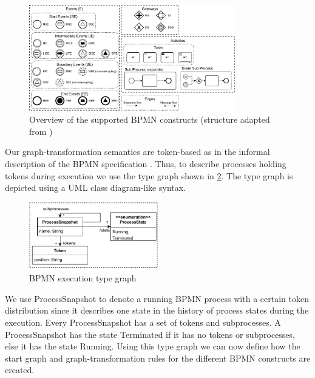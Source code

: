 \documentclass[adraft, copyright, creativecommons]{eptcs} %
\begin{document}
\begin{figure}[h]
    \centering
    \includegraphics[width=0.8\textwidth]{images/bpmn_semantics-feature_overview.pdf}
    \caption{Overview of the supported BPMN constructs (structure adapted from \cite{houhouFirstOrderLogicVerification2022})}
    \label{fig:bpmnConstructsOverview}
\end{figure}

Our graph-transformation semantics are token-based as in the informal description of the BPMN specification \cite{objectmanagementgroupBusinessProcessModel2013}.
Thus, to describe processes holding tokens during execution we use the type graph shown in \cref{fig:typeGraph}.
The type graph is depicted using a UML class diagram-like syntax.

\begin{figure}[h]
    \centering
    \includegraphics[width=0.5\textwidth]{images/bpmn_semantics-typegraph.pdf}
    \caption{BPMN execution type graph}
    \label{fig:typeGraph}
\end{figure}

We use \textsf{ProcessSnapshot} to denote a running BPMN process with a certain token distribution since it describes one state in the history of process states during the execution.
Every \textsf{ProcessSnapshot} has a set of \textsf{tokens} and \textsf{subprocesses}.
A \textsf{ProcessSnapshot} has the state \textsf{Terminated} if it has no \textsf{tokens} or \textsf{subprocesses}, else it has the state \textsf{Running}.
Using this type graph we can now define how the start graph and graph-transformation rules for the different BPMN constructs are created.
\end{document}
